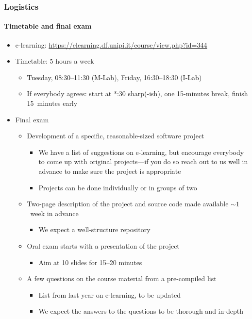 \documentclass[9pt]{beamer}
\begin{document}
\begin{frame}
  \frametitle{Logistics}
  \framesubtitle{Timetable and final exam}
  \begin{itemize}
  \item e-learning: {\scriptsize \url{https://elearning.df.unipi.it/course/view.php?id=344}}
  \item Timetable: 5 hours a week
    \begin{itemize}
    \item \alert{Tuesday, 08:30--11:30 (M-Lab), Friday, 16:30--18:30 (I-Lab)}
    \item If everybody agrees: start at *:30 sharp(-ish), one 15-minutes break,
      finish 15~minutes early
    \end{itemize}
  \item Final exam
    \begin{itemize}
    \item Development of a specific, reasonable-sized \alert{software project}
    \begin{itemize}
      \item We have a list of suggestions on e-learning, but encourage everybody
        to come up with original projects---\alert{if you do so reach out to us
        well in advance to make sure the project is appropriate}
      \item Projects can be done \alert{individually or in groups of two}
    \end{itemize}
    \item Two-page description of the project and source code made
      available $\sim 1$~week in advance
      \begin{itemize}
        \item We expect a well-structure repository
      \end{itemize}
    \item Oral exam starts with a presentation of the project
    \begin{itemize}
      \item Aim at 10 slides for 15--20 minutes
    \end{itemize}
    \item \alert{A few questions on the course material from a pre-compiled list}
    \begin{itemize}
      \item List from last year on e-learning, to be updated
      \item We expect the answers to the questions to be thorough and in-depth
    \end{itemize}
    \end{itemize}
  \end{itemize}
\end{frame}
\end{document}
